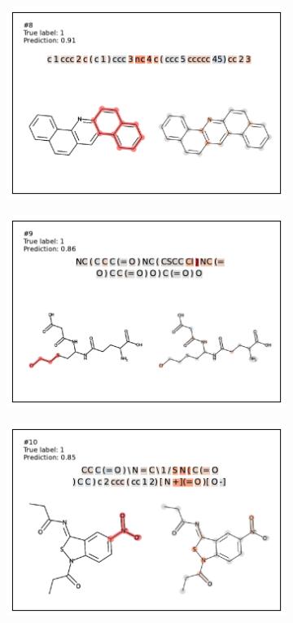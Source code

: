 \begin{figure}
\begin{subfigure}[b]{0.33\textwidth}
\end{subfigure} 
\begin{subfigure}[b]{0.33\textwidth} 
  \centering 
  \includegraphics[width=\textwidth]{figures/ames/ames8.pdf} 
\end{subfigure}\begin{subfigure}[b]{0.33\textwidth} 
  \centering 
  \includegraphics[width=\textwidth]{figures/ames/ames9.pdf} 
\end{subfigure}\begin{subfigure}[b]{0.33\textwidth} 
  \centering 
  \includegraphics[width=\textwidth]{figures/ames/ames10.pdf} 

\end{subfigure}
\end{figure}
